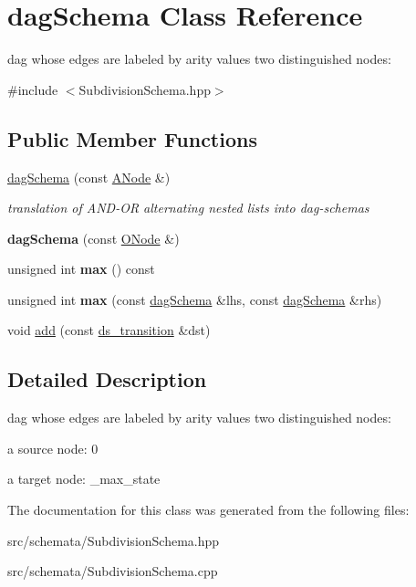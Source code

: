 \hypertarget{classdagSchema}{}\section{dag\+Schema Class Reference}
\label{classdagSchema}


dag whose edges are labeled by arity values two distinguished nodes\+:  




{\ttfamily \#include $<$Subdivision\+Schema.\+hpp$>$}

\subsection*{Public Member Functions}
\begin{DoxyCompactItemize}
\item 
\mbox{\hyperlink{group__schemata_ga1762a1cf61c23100f58a69f092f94e27}{dag\+Schema}} (const \mbox{\hyperlink{classANode}{A\+Node}} \&)
\begin{DoxyCompactList}\small\item\em translation of A\+N\+D-\/\+OR alternating nested lists into dag-\/schemas \end{DoxyCompactList}\item 
{\bfseries dag\+Schema} (const \mbox{\hyperlink{classONode}{O\+Node}} \&)
\item 
\mbox{\label{classdagSchema_ade079e9d6738c9bb02123d6c3cf01331}} 
unsigned int {\bfseries max} () const
\item 
\mbox{\label{classdagSchema_af4e948da7d717f8f4600f0e9dcdadec1}} 
unsigned int {\bfseries max} (const \mbox{\hyperlink{classdagSchema}{dag\+Schema}} \&lhs, const \mbox{\hyperlink{classdagSchema}{dag\+Schema}} \&rhs)
\item 
void \mbox{\hyperlink{group__schemata_ga0dc3e9cf7edbc289976639574ca23d20}{add}} (const \mbox{\hyperlink{structds__transition}{ds\+\_\+transition}} \&dst)
\end{DoxyCompactItemize}


\subsection{Detailed Description}
dag whose edges are labeled by arity values two distinguished nodes\+: 


\begin{DoxyItemize}
\item a source node\+: 0
\item a target node\+: \+\_\+max\+\_\+state 
\end{DoxyItemize}

The documentation for this class was generated from the following files\+:\begin{DoxyCompactItemize}
\item 
src/schemata/Subdivision\+Schema.\+hpp\item 
src/schemata/Subdivision\+Schema.\+cpp\end{DoxyCompactItemize}
